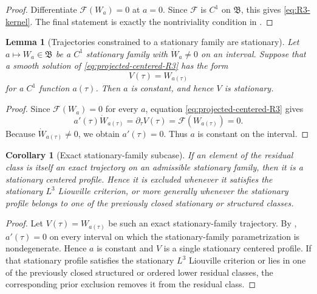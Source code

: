 \documentclass[11pt]{amsart}
\numberwithin{equation}{section}
\theoremstyle{plain}
\newtheorem{lemma}[theorem]{Lemma}
\newtheorem{corollary}[theorem]{Corollary}
\theoremstyle{definition}
\theoremstyle{remark}
\begin{document}
\begin{proof}
Differentiate \(\mathcal F(W_a)=0\) at \(a=0\).  Since \(\mathcal F\) is \(C^1\)
on \(\mathfrak B\), this gives \eqref{eq:R3-kernel}.  The final statement is
exactly the nontriviality condition in .
\end{proof}

\begin{lemma}[Trajectories constrained to a stationary family are stationary]
\label{lem:R3-family-constrained-stationary}
Let \(a\mapsto W_a\in\mathfrak B\) be a \(C^1\) stationary family with
\(\dot W_a\ne0\) on an interval.  Suppose that a smooth solution of
\eqref{eq:projected-centered-R3} has the form
\begin{equation}\label{eq:R3-family-trajectory}
   V(\tau)=W_{a(\tau)}
\end{equation}
for a \(C^1\) function \(a(\tau)\).  Then \(a\) is constant, and hence
\(V\) is stationary.
\end{lemma}

\begin{proof}
Since \(\mathcal F(W_a)=0\) for every \(a\), equation
\eqref{eq:projected-centered-R3} gives
\[
   a'(\tau)\dot W_{a(\tau)}=\partial_\tau V(\tau)=\mathcal F(W_{a(\tau)})=0 .
\]
Because \(\dot W_{a(\tau)}\ne0\), we obtain \(a'(\tau)=0\).  Thus \(a\) is
constant on the interval.
\end{proof}

\begin{corollary}[Exact stationary-family subcase]
\label{cor:R3-exact-family-subcase}
If an element of the residual class is itself an exact trajectory on an
admissible stationary family, then it is a stationary centered profile.  Hence
it is excluded whenever it satisfies the stationary \(L^3\) Liouville
criterion, or more generally whenever the stationary profile belongs to one of
the previously closed stationary or structured classes.
\end{corollary}

\begin{proof}
Let \(V(\tau)=W_{a(\tau)}\) be such an exact stationary-family trajectory.  By
, \(a'(\tau)=0\) on every interval on
which the stationary-family parametrization is nondegenerate.  Hence \(a\) is constant and
\(V\) is a single stationary centered profile.  If that stationary profile
satisfies the stationary \(L^3\) Liouville criterion or lies in one of the
previously closed structured or ordered lower residual classes, the corresponding
prior exclusion removes it from the residual class.
\end{proof}
\end{document}
